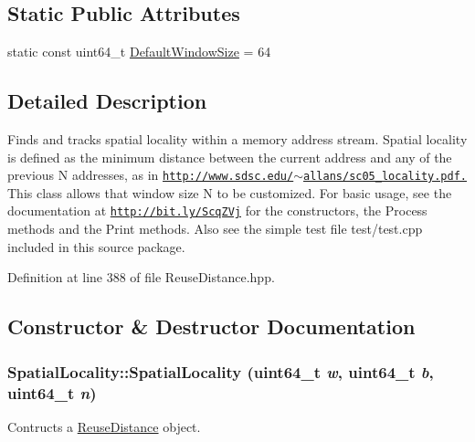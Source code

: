 \subsection*{Static Public Attributes}
\begin{DoxyCompactItemize}
\item 
static const uint64\_\-t \hyperlink{class_spatial_locality_a563aa890ea539ae76c942fd1827a3095}{DefaultWindowSize} = 64
\end{DoxyCompactItemize}


\subsection{Detailed Description}
Finds and tracks spatial locality within a memory address stream. Spatial locality is defined as the minimum distance between the current address and any of the previous N addresses, as in \href{http://www.sdsc.edu/~allans/sc05_locality.pdf.}{\tt http://www.sdsc.edu/$\sim$allans/sc05\_\-locality.pdf.} This class allows that window size N to be customized. For basic usage, see the documentation at \href{http://bit.ly/ScqZVj}{\tt http://bit.ly/ScqZVj} for the constructors, the Process methods and the Print methods. Also see the simple test file test/test.cpp included in this source package. 

Definition at line 388 of file ReuseDistance.hpp.



\subsection{Constructor \& Destructor Documentation}
\hypertarget{class_spatial_locality_aff3106d38ff5ba3e6ecaec0c7214eaea}{
\subsubsection[{SpatialLocality}]{\setlength{\rightskip}{0pt plus 5cm}SpatialLocality::SpatialLocality (uint64\_\-t {\em w}, \/  uint64\_\-t {\em b}, \/  uint64\_\-t {\em n})}}
\label{class_spatial_locality_aff3106d38ff5ba3e6ecaec0c7214eaea}
Contructs a \hyperlink{class_reuse_distance}{ReuseDistance} object.



